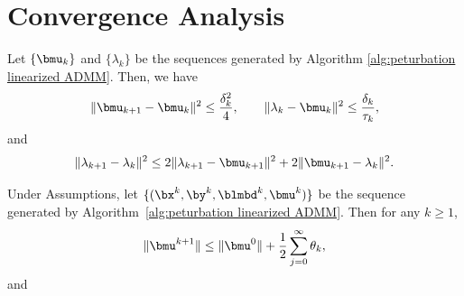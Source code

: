 \section{Convergence Analysis}
\begin{lemma}
Let $\{\bmu_k\}$ and $\{\lambda_k\}$ be the sequences generated by Algorithm \eqref{alg:peturbation linearized ADMM}. Then, we have
\begin{equation}
    \|\bmu_{k+1} - \bmu_k\|^2 \leq \frac{\delta_k^2}{4}, \qquad
    \|\lambda_k - \bmu_k\|^2 \leq \frac{\delta_k}{\tau_k},
\end{equation}
and
\begin{equation}
    \|\lambda_{k+1} - \lambda_k\|^2 \leq 2\|\lambda_{k+1} - \bmu_{k+1}\|^2 + 2\|\bmu_{k+1} - \lambda_k\|^2.
\end{equation}
\end{lemma}

\begin{lemma}\label{lem:lambda-bound}
Under Assumptions, let $\{(\bx^k,\by^k,\blmbd^k,\bmu^k)\}$ 
be the sequence generated by Algorithm~\ref{alg:peturbation linearized ADMM}.
Then for any $k \geq 1$,
\begin{equation}
    \|\bmu^{k+1}\| \leq \|\bmu^0\| + \frac{1}{2}\sum_{j=0}^{\infty} \theta_k,
\end{equation}
and 
\end{lemma}
